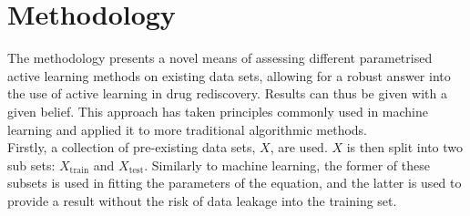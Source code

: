 \chapter{Methodology}


\graphicspath{{Chapter3/Figs/Vector/}{Chapter3/Figs/}}
The methodology presents a novel means of assessing different parametrised active learning methods on existing data sets, allowing for a robust answer into the use of active learning in drug rediscovery. Results can thus be given with a given belief. This approach has taken principles commonly used in machine learning and applied it to more traditional algorithmic methods.
\\
Firstly, a collection of pre-existing data sets, $X$, are used. $X$ is then split into two sub sets: $X_{\mathrm{train}}$ and $X_\mathrm{test}$. Similarly to machine learning, the former of these subsets is used in fitting the parameters of the equation, and the latter is used to provide a result without the risk of data leakage into the training set.
\blindtext[3]